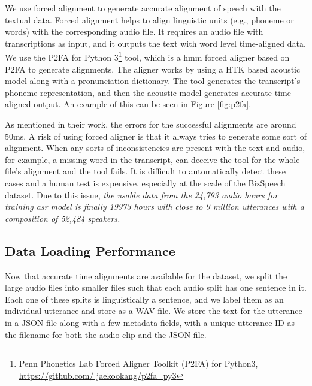 We use forced alignment to generate accurate alignment of speech with the textual data. Forced alignment helps to align linguistic units (e.g., phoneme or words) with the corresponding audio file. It requires an audio file with transcriptions as input, and it outputs the text with word level time-aligned data. We use the P2FA for Python 3\footnote{Penn Phonetics Lab Forced Aligner Toolkit (P2FA) for Python3, \href{https://github.com/jaekookang/p2fa\_py3}{https://github.com/ jaekookang/p2fa\_py3}} tool, which is a \acrshort{hmm} forced aligner based on P2FA \cite{Yuan2008SPEAKERCORPUS} to generate alignments. The aligner works by using a HTK \cite{Young2002TheBook} based acoustic model along with a pronunciation dictionary. The tool generates the transcript's phoneme representation, and then the acoustic model generates accurate time-aligned output. An example of this can be seen in Figure \ref{fig:p2fa}.

As mentioned in their work, the errors for the successful alignments are around 50ms. A risk of using forced aligner is that it always tries to generate some sort of alignment. When any sorts of inconsistencies are present with the text and audio, for example, a missing word in the transcript, can deceive the tool for the whole file's alignment and the tool fails. It is difficult to automatically detect these cases and a human test is expensive, especially at the scale of the BizSpeech dataset. Due to this issue, \emph{the usable data from the 24,793 audio hours for training \acrshort{asr} model is finally 19973 hours with close to 9 million utterances with a composition of 52,484 speakers.}

\subsection{Data Loading Performance}
Now that accurate time alignments are available for the dataset, we split the large audio files into smaller files such that each audio split has one sentence in it. Each one of these splits is linguistically a sentence, and we label them as an individual utterance and store as a WAV file. We store the text for the utterance in a JSON file along with a few metadata fields, with a unique utterance ID as the filename for both the audio clip and the JSON file. 


